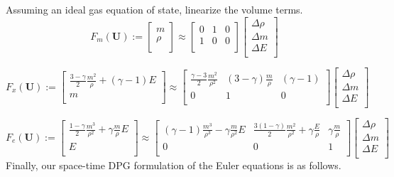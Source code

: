 \documentclass{article}
\begin{document}
Assuming an ideal gas equation of state, linearize the volume terms.
\begin{equation*}
F_m(\mathbf{U}):=
\left[
\begin{array}{c}
   m\\
   \rho\\
\end{array}
\right]
\approx
\left[
\begin{array}{ccc}
   0 & 1 & 0\\
   1 & 0 & 0\\
\end{array}
\right]
\left[
\begin{array}{c}
   \Delta\rho\\
   \Delta m\\
   \Delta E\\
\end{array}
\right]
\end{equation*}

\begin{equation*}
F_x(\mathbf{U}):=
\left[
\begin{array}{c}
   \frac{3-\gamma}{2}\frac{m^2}{\rho}+(\gamma-1)E\\
   m\\
\end{array}
\right]
\approx
\left[
\begin{array}{ccc}
   \frac{\gamma-3}{2}\frac{m^2}{\rho^2} & (3-\gamma)\frac{m}{\rho} & (\gamma-1)\\
   0 & 1 & 0\\
\end{array}
\right]
\left[
\begin{array}{c}
   \Delta\rho\\
   \Delta m\\
   \Delta E\\
\end{array}
\right]
\end{equation*}

\begin{equation*}
F_e(\mathbf{U}):=
\left[
\begin{array}{c}
   \frac{1-\gamma}{2}\frac{m^3}{\rho^2}+\gamma\frac{m}{\rho}E\\
   E\\
\end{array}
\right]
\approx
\left[
\begin{array}{ccc}
   (\gamma-1)\frac{m^3}{\rho^3}-\gamma\frac{m}{\rho^2}E &
   \frac{3(1-\gamma)}{2}\frac{m^2}{\rho^2}+\gamma\frac{E}{\rho}&
   \gamma\frac{m}{\rho}\\
   0 & 0 & 1\\
\end{array}
\right]
\left[
\begin{array}{c}
   \Delta\rho\\
   \Delta m\\
   \Delta E\\
\end{array}
\right]
\end{equation*}
Finally, our space-time DPG formulation of the Euler equations is as follows.
\end{document}
